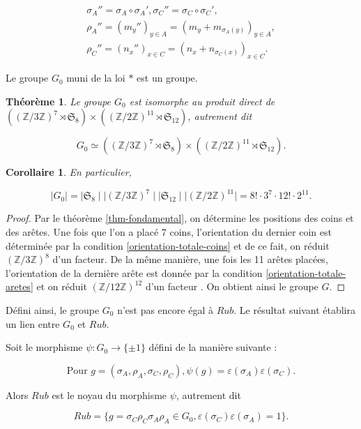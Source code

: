 \documentclass[french]{report}
\newtheorem{theorem}{Théorème}
\newtheorem*{corollary}{Corollaire}
\begin{document}
\begin{gather*}
  \sigma_A''= \sigma_A \circ \sigma_A', \sigma_C'' = \sigma_C \circ \sigma_C',\\
  \rho_A'' = (m_y'') _{y \in A} = (m_y + m _{\sigma_A(y)}) _{y \in A}, \\
  \rho_C'' = (n_x'') _{x \in C} = (n_x + n _{\sigma_C(x)}) _{x \in C}.
\end{gather*}

Le groupe $G_0$ muni de la loi $*$ est un groupe.

\begin{theorem}
  Le groupe $G_0$ est isomorphe au produit direct de $( (\mathbb{Z}/{ 3 }\mathbb{Z})^{7} \rtimes \mathfrak{S}_{8}) \times ( (\mathbb{Z}/{ 2 }\mathbb{Z}) ^{11} \rtimes \mathfrak{S}_{12}  )$, autrement dit

  \begin{equation*}
    G_0 \simeq ( (\mathbb{Z}/{ 3 }\mathbb{Z})^{7} \rtimes \mathfrak{S}_{8}) \times ( (\mathbb{Z}/{ 2 }\mathbb{Z})^{11} \rtimes \mathfrak{S}_{12}  ).
  \end{equation*}
\end{theorem}

\begin{corollary}
  En particulier,

  \begin{equation*}
    \mid G_0 \mid = \mid \mathfrak{S}_{8}  \mid \mid (\mathbb{Z}/{ 3 }\mathbb{Z})^{7} \mid \mid \mathfrak{S}_{12}\mid \mid (\mathbb{Z}/{ 2 }\mathbb{Z})^{11} \mid = 8! \cdot 3 ^{7} \cdot 12 ! \cdot 2 ^{11}.
  \end{equation*}
\end{corollary}

\begin{proof}
  Par le théorème \ref{thm-fondamental}, on détermine les positions des coins et des arêtes. Une fois que l'on a placé 7 coins, l'orientation du dernier coin est déterminée par la condition \ref{orientation-totale-coins} et de ce fait, on réduit $(\mathbb{Z}/{ 3 }\mathbb{Z}) ^{8}$ d'un facteur. De la même manière, une fois les 11 arêtes placées, l'orientation de la dernière arête est donnée par la condition \ref{orientation-totale-aretes} et on réduit $ (\mathbb{Z}/{ 12 }\mathbb{Z})^{12}$ d'un facteur . On obtient ainsi le groupe $G$.
\end{proof}

Défini ainsi, le groupe $G_0$ n'est pas encore égal à $Rub$. Le résultat suivant établira un lien entre $G_0$ et $Rub$.

\begin{thm}
  Soit le morphisme $\psi : G_0 \to \{ \pm 1 \} $ défini de la manière suivante :

  $$ \text{Pour } g = (\sigma_A, \rho_A, \sigma_C, \rho_C), \psi(g) = \varepsilon (\sigma_A ) \varepsilon (\sigma_C).$$

  Alors $Rub$ est le noyau du morphisme $\psi$, autrement dit

  \begin{equation*}
    Rub = \{ g = \sigma_C \rho_C  \sigma_A \rho_A \in G_0, \varepsilon (\sigma_C) \varepsilon (\sigma_A) = 1 \}.
  \end{equation*}
\end{thm}
\end{document}
